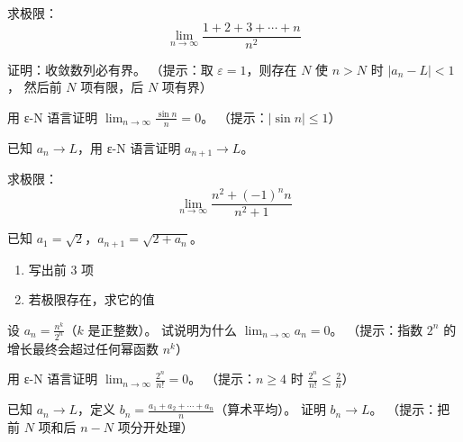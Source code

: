 \begin{exercise}[4]
求极限：
\[
\lim_{n\to\infty} \frac{1 + 2 + 3 + \cdots + n}{n^2}
\]
\end{exercise}

\begin{exercise}[4]
证明：收敛数列必有界。
（提示：取 \(\varepsilon = 1\)，则存在 \(N\) 使 \(n>N\) 时 \(|a_n - L| < 1\)，
然后前 \(N\) 项有限，后 \(N\) 项有界）
\end{exercise}


\begin{exercise}[5]
用 ε-N 语言证明 \(\displaystyle \lim_{n\to\infty} \frac{\sin n}{n} = 0\)。
（提示：\(|\sin n| \le 1\)）
\end{exercise}

\begin{exercise}[5]
已知 \(a_n \to L\)，用 ε-N 语言证明 \(a_{n+1} \to L\)。
\end{exercise}

\begin{exercise}[5]
求极限：
\[
\lim_{n\to\infty} \frac{n^2 + (-1)^n n}{n^2 + 1}
\]
\end{exercise}

\begin{exercise}[5]
已知 \(a_1 = \sqrt{2}\)，\(a_{n+1} = \sqrt{2 + a_n}\)。
\begin{enumerate}
  \item[(1)] 写出前 3 项
  \item[(2)] 若极限存在，求它的值
\end{enumerate}
\end{exercise}


\begin{exercise}[6]
设 \(a_n = \frac{n^k}{2^n}\)（\(k\) 是正整数）。
试说明为什么 \(\displaystyle \lim_{n\to\infty} a_n = 0\)。
（提示：指数 \(2^n\) 的增长最终会超过任何幂函数 \(n^k\)）
\end{exercise}

\begin{exercise}[6]
用 ε-N 语言证明 \(\displaystyle \lim_{n\to\infty} \frac{2^n}{n!} = 0\)。
（提示：\(n \ge 4\) 时 \(\frac{2^n}{n!} \le \frac{2}{n}\)）
\end{exercise}

\begin{exercise}[6]
已知 \(a_n \to L\)，定义 \(b_n = \frac{a_1 + a_2 + \cdots + a_n}{n}\)（算术平均）。
证明 \(b_n \to L\)。
（提示：把前 \(N\) 项和后 \(n-N\) 项分开处理）
\end{exercise}

